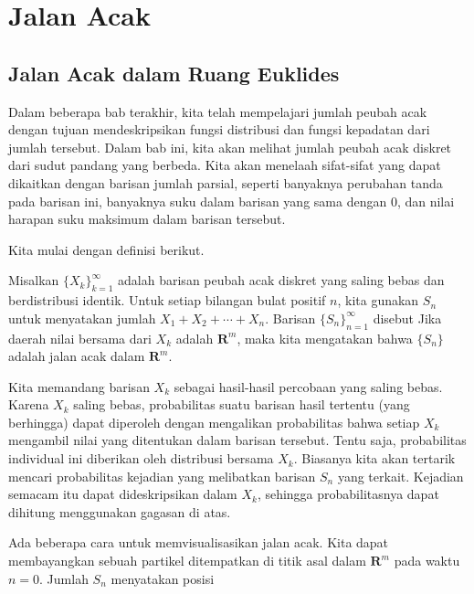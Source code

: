 

\chapter{Jalan Acak}\label{chp 12}  

\section{Jalan Acak dalam Ruang Euklides}\label{sec 12.1}

\par
Dalam beberapa bab terakhir, kita telah mempelajari jumlah peubah acak dengan tujuan
mendeskripsikan fungsi distribusi dan fungsi kepadatan dari jumlah tersebut.  Dalam bab ini, kita akan melihat
jumlah peubah acak diskret dari sudut pandang yang berbeda.  Kita akan menelaah
sifat-sifat yang dapat dikaitkan dengan barisan jumlah parsial, seperti banyaknya
perubahan tanda pada barisan ini, banyaknya suku dalam barisan yang sama dengan 0, dan
nilai harapan suku maksimum dalam barisan tersebut.
\par
Kita mulai dengan definisi berikut.
\begin{definition} 
 Misalkan $\{X_k\}_{k = 1}^\infty$ adalah barisan peubah acak diskret yang saling bebas dan
berdistribusi identik.  Untuk setiap bilangan bulat positif $n$, kita gunakan $S_n$ untuk menyatakan jumlah $X_1 + X_2 +
\cdots + X_n$.  Barisan $\{S_n\}_{n = 1}^\infty$ disebut   Jika daerah nilai bersama dari $X_k$ adalah ${\mathbf R}^m$, maka kita mengatakan bahwa
$\{S_n\}$ adalah jalan acak dalam ${\mathbf R}^m$.
\end{definition} 
\par
Kita memandang barisan $X_k$ sebagai hasil-hasil percobaan yang saling bebas.  Karena
$X_k$ saling bebas, probabilitas suatu barisan hasil tertentu (yang berhingga) dapat
diperoleh dengan mengalikan probabilitas bahwa setiap $X_k$ mengambil nilai yang ditentukan dalam
barisan tersebut.  Tentu saja, probabilitas individual ini diberikan oleh distribusi bersama
$X_k$.  Biasanya kita akan tertarik mencari probabilitas kejadian yang melibatkan
barisan $S_n$ yang terkait.  Kejadian semacam itu dapat dideskripsikan dalam $X_k$, sehingga
probabilitasnya dapat dihitung menggunakan gagasan di atas.
\par
Ada beberapa cara untuk memvisualisasikan jalan acak.  Kita dapat membayangkan sebuah partikel
ditempatkan di titik asal dalam ${\mathbf R}^m$ pada waktu $n = 0$.  Jumlah $S_n$ menyatakan posisi
